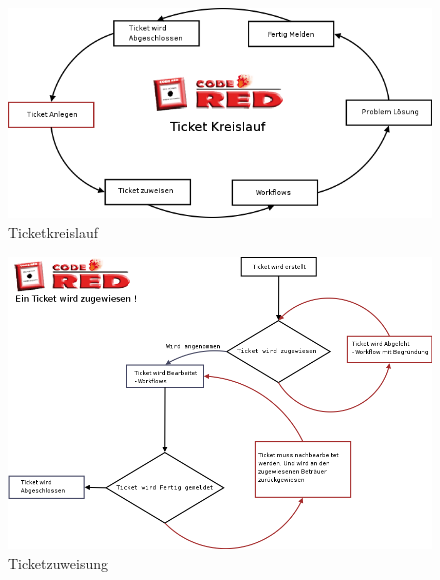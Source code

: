 \begin{figure}[h]
\begin{center}
   \includegraphics[width=450pt]{../bilder/Ticketkleislauf.png}
   \caption{Ticketkreislauf}
   \label{Ticketkreislauf}
\end{center}
\end{figure}
\vspace{2cm}
\begin{figure}[h]
\begin{center}
   \includegraphics[width=450pt]{../bilder/Ticketzuweisung.png}
   \caption{Ticketzuweisung}
   \label{Ticketzuweisung}
\end{center}
\end{figure}

  